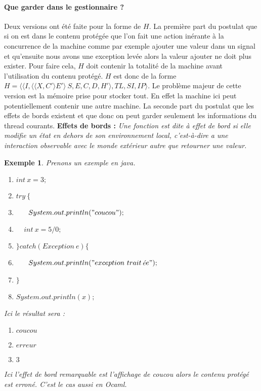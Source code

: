 \documentclass[10pt,a4paper]{report}
\newtheorem{ex}{Exemple}
\begin{document}
	\paragraph{Que garder dans le gestionnaire ?} 
	Deux versions ont été faite pour la forme de $H$. 
	\smallbreak
	La première part du postulat que si on est dans le contenu protégée que l'on fait une action inérante à la concurrence de la machine comme par exemple ajouter une valeur dans un signal et qu'ensuite nous avons une exception levée alors la valeur ajouter ne doit plus exister. Pour faire cela, $H$ doit contenir la totalité de la machine avant l'utilisation du contenu protégé. $H$ est donc de la forme $H = \langle \langle I,\langle\langle X,C'\rangle E'\rangle~S,E,C,D,H'\rangle,TL,SI,IP\rangle$. Le problème majeur de cette version est la mémoire prise pour stocker tout. En effet la machine ici peut potentiellement contenir une autre machine.
	\smallbreak
	La seconde part du postulat que les effets de bords existent et que donc on peut garder seulement les informations du thread courants.
	\smallbreak
	\textbf{Effets de bords :} \textit{Une fonction est dite à effet de bord  si elle modifie un état en dehors de son environnement local, c'est-à-dire a une interaction observable avec le monde extérieur autre que retourner une valeur.}
	\medbreak
	
	\begin{ex}
		Prenons un exemple en java. 
		\smallbreak
		\begin{enumerate}
			\item $int~x = 3;$
			\item $try~\{$
			\item $~~~~~System.out.println("coucou");$
			\item $~~~~~int~x = 5/0;$
			\item $\}catch(Exception~e)\{$
			\item $~~~~~System.out.println("exception~trait$é$e");$
			\item $\}$
			\item $System.out.println(x);$
		\end{enumerate}
		Ici le résultat sera :
		\begin{enumerate}
			\item[] $coucou$
			\item[] $erreur$
			\item[] $3$
		\end{enumerate}
		Ici l'effet de bord remarquable est l'affichage de coucou alors le contenu protégé est erroné. C'est le cas aussi en Ocaml.
	\end{ex}
	\medbreak
	
\end{document}
